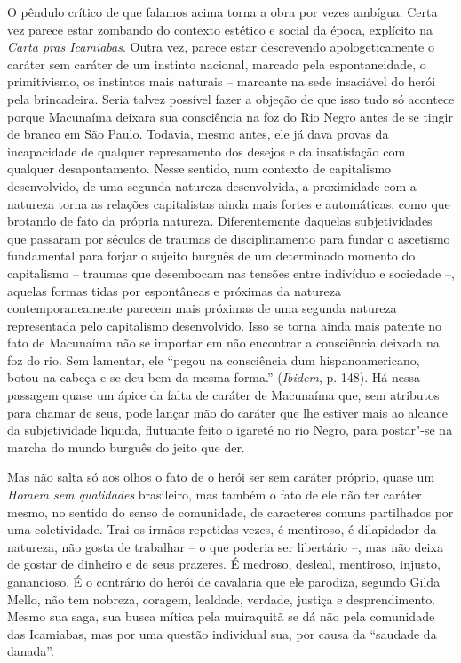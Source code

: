 {O pêndulo crítico de que falamos acima torna a obra por vezes ambígua.
Certa vez parece estar zombando do contexto estético e social da época,
explícito na \emph{Carta pras Icamiabas}. Outra vez, parece estar
descrevendo apologeticamente o caráter sem caráter de um instinto
nacional, marcado pela espontaneidade, o primitivismo, os instintos mais
naturais -- marcante na sede insaciável do herói pela brincadeira. Seria
talvez possível fazer a objeção de que isso tudo só acontece porque
Macunaíma deixara sua consciência na foz do Rio Negro antes de se tingir
de branco em São Paulo. Todavia, mesmo antes, ele já dava provas da
incapacidade de qualquer represamento dos desejos e da insatisfação com
qualquer desapontamento. Nesse sentido, num contexto de capitalismo
desenvolvido, de uma segunda natureza desenvolvida, a proximidade com a
natureza torna as relações capitalistas ainda mais fortes e automáticas,
como que brotando de fato da própria natureza. Diferentemente daquelas
subjetividades que passaram por séculos de traumas de disciplinamento
para fundar o ascetismo fundamental para forjar o sujeito burguês de um
determinado momento do capitalismo -- traumas que desembocam nas tensões
entre indivíduo e sociedade --, aquelas formas tidas por espontâneas e
próximas da natureza contemporaneamente parecem mais próximas de uma
segunda natureza representada pelo capitalismo desenvolvido. Isso se
torna ainda mais patente no fato de Macunaíma não se importar em não
encontrar a consciência deixada na foz do rio. Sem lamentar, ele ``pegou
na consciência dum hispanoamericano, botou na cabeça e se deu bem da
mesma forma.'' (\emph{Ibidem}, p. 148). Há nessa passagem quase um ápice
da falta de caráter de Macunaíma que, sem atributos para chamar de seus,
pode lançar mão do caráter que lhe estiver mais ao alcance da
subjetividade líquida, flutuante feito o igareté no rio Negro, para
postar"-se na marcha do mundo burguês do jeito que der.

Mas não salta só aos olhos o fato de o herói ser sem caráter próprio,
quase um \emph{Homem sem qualidades} brasileiro, mas também o fato de
ele não ter caráter mesmo, no sentido do senso de comunidade, de
caracteres comuns partilhados por uma coletividade. Trai os irmãos
repetidas vezes, é mentiroso, é dilapidador da natureza, não gosta de
trabalhar -- o que poderia ser libertário --, mas não deixa de gostar de
dinheiro e de seus prazeres. É medroso, desleal, mentiroso, injusto,
ganancioso. É o contrário do herói de cavalaria que ele parodiza,
segundo Gilda Mello, não tem nobreza, coragem, lealdade, verdade,
justiça e desprendimento. Mesmo sua saga, sua busca mítica pela
muiraquitã se dá não pela comunidade das Icamiabas, mas por uma questão
individual sua, por causa da ``saudade da danada''.

}
